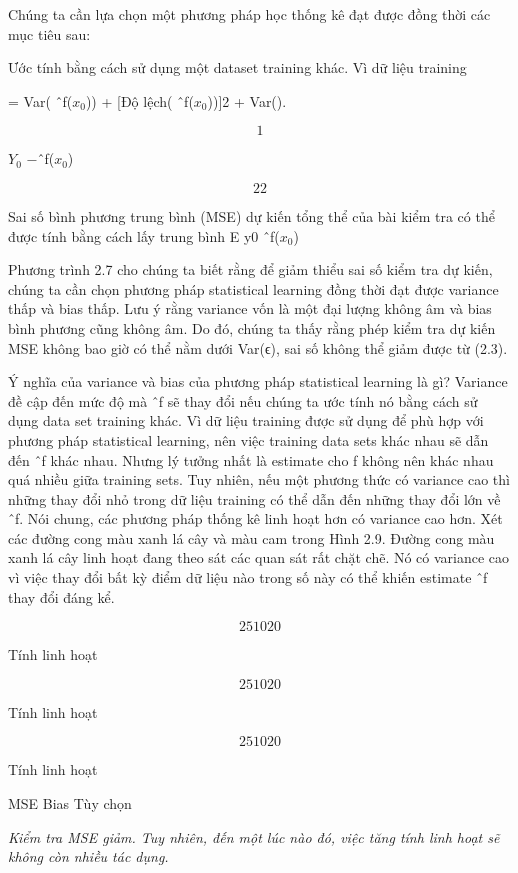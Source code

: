 Chúng ta cần lựa chọn một phương pháp học thống kê đạt được đồng thời các mục tiêu sau:

Ước tính bằng cách sử dụng một dataset training khác. Vì dữ liệu training

= Var( ˆf($x_{0}$)) + [Độ lệch( ˆf($x_{0}$))]2 + Var().

\[1\]

$Y_{0}$ −ˆf($x_{0}$)

\[22\]

Sai số bình phương trung bình (MSE) dự kiến tổng thể của bài kiểm tra có thể được tính bằng cách lấy trung bình E y0   ˆf($x_{0}$)

Phương trình 2.7 cho chúng ta biết rằng để giảm thiểu sai số kiểm tra dự kiến, chúng ta cần chọn phương pháp statistical learning đồng thời đạt được variance thấp và bias thấp. Lưu ý rằng variance vốn là một đại lượng không âm và bias bình phương cũng không âm. Do đó, chúng ta thấy rằng phép kiểm tra dự kiến ​​MSE không bao giờ có thể nằm dưới Var(ϵ), sai số không thể giảm được từ (2.3).

Ý nghĩa của variance và bias của phương pháp statistical learning là gì? Variance đề cập đến mức độ mà ˆf sẽ thay đổi nếu chúng ta ước tính nó bằng cách sử dụng data set training khác. Vì dữ liệu training được sử dụng để phù hợp với phương pháp statistical learning, nên việc training data sets khác nhau sẽ dẫn đến ˆf khác nhau. Nhưng lý tưởng nhất là estimate cho f không nên khác nhau quá nhiều giữa training sets. Tuy nhiên, nếu một phương thức có variance cao thì những thay đổi nhỏ trong dữ liệu training có thể dẫn đến những thay đổi lớn về ˆf. Nói chung, các phương pháp thống kê linh hoạt hơn có variance cao hơn. Xét các đường cong màu xanh lá cây và màu cam trong Hình 2.9. Đường cong màu xanh lá cây linh hoạt đang theo sát các quan sát rất chặt chẽ. Nó có variance cao vì việc thay đổi bất kỳ điểm dữ liệu nào trong số này có thể khiến estimate ˆf thay đổi đáng kể.

\[2 5 10 20\]

Tính linh hoạt

\[2 5 10 20\]

Tính linh hoạt

\[2 5 10 20\]

Tính linh hoạt

MSE Bias Tùy chọn

\noindent\textit{Kiểm tra MSE giảm. Tuy nhiên, đến một lúc nào đó, việc tăng tính linh hoạt sẽ không còn nhiều tác dụng.}

